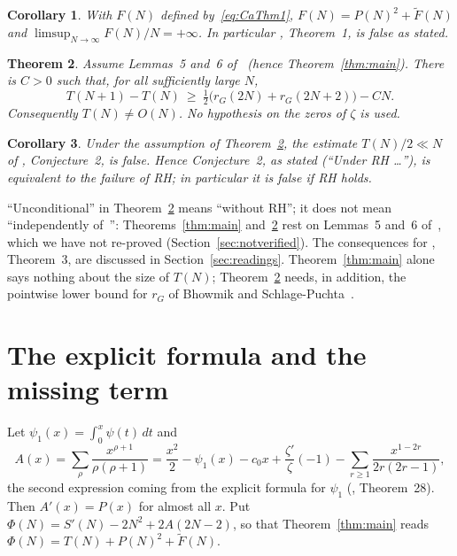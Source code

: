 \documentclass[11pt]{amsart}
\newtheorem{theorem}{Theorem}[section]
\newtheorem{corollary}[theorem]{Corollary}
\theoremstyle{definition}
\theoremstyle{remark}
\numberwithin{equation}{section}
\newcommand{\rG}{r_G}
\newcommand{\Sp}{S'}
\newcommand{\Ft}{\widetilde F}
\newcommand{\Ca}{\cite{Ca}}
\begin{document}
\begin{corollary}\label{cor:F}
With $F(N)$ defined by~\eqref{eq:CaThm1}, $F(N)=P(N)^2+\Ft(N)$ and
$\limsup_{N\to\infty}F(N)/N=+\infty$. In particular \Ca{}, Theorem~1, is false as stated.
\end{corollary}

\begin{theorem}\label{thm:C}
Assume Lemmas~5 and~6 of~\Ca{} \textup{(}hence Theorem~\ref{thm:main}\textup{)}. There
is $C>0$ such that, for all sufficiently large $N$,
\[
  T(N+1)-T(N)\ \ge\ \tfrac12\bigl(\rG(2N)+\rG(2N+2)\bigr)-CN .
\]
Consequently $T(N)\neq O(N)$. No hypothesis on the zeros of $\zeta$ is used.
\end{theorem}

\begin{corollary}\label{cor:conj}
Under the assumption of Theorem~\ref{thm:C}, the estimate $T(N)/2\ll N$ of
\Ca{}, Conjecture~2, is false. Hence Conjecture~2, as stated (``Under RH \dots''), is
equivalent to the failure of RH; in particular it is false if RH holds.
\end{corollary}

``Unconditional'' in Theorem~\ref{thm:C} means ``without RH''; it does not mean
``independently of~\Ca{}'': Theorems~\ref{thm:main} and~\ref{thm:C} rest on Lemmas~5
and~6 of~\Ca{}, which we have not re-proved (Section~\ref{sec:notverified}).
The consequences for \Ca{}, Theorem~3, are discussed in Section~\ref{sec:readings}.
Theorem~\ref{thm:main} alone says nothing about the size of $T(N)$; Theorem~\ref{thm:C}
needs, in addition, the pointwise lower bound for $\rG$ of Bhowmik and
Schlage-Puchta~\cite{BSP}.

\section{The explicit formula and the missing term}\label{sec:formula}

Let $\psi_1(x)=\int_0^x\psi(t)\,dt$ and
\[
  A(x)=\sum_\rho\frac{x^{\rho+1}}{\rho(\rho+1)}
  =\frac{x^2}{2}-\psi_1(x)-c_0x+\frac{\zeta'}{\zeta}(-1)-\sum_{r\ge1}\frac{x^{1-2r}}{2r(2r-1)},
\]
the second expression coming from the explicit formula for $\psi_1$
(\cite{In}, Theorem~28). Then $A'(x)=P(x)$ for almost all $x$.
Put $\Phi(N)=\Sp(N)-2N^2+2A(2N-2)$, so that Theorem~\ref{thm:main} reads
$\Phi(N)=T(N)+P(N)^2+\Ft(N)$.
\end{document}
